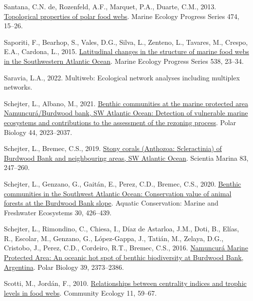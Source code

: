 \documentclass[preprint, 3p,
authoryear]{elsarticle} %
\newlength{\cslhangindent}
\newlength{\cslentryspacingunit} %
\newenvironment{CSLReferences}[2] %
 {%
  \setlength{\parindent}{0pt}
  \ifodd #1
  \let\oldpar\par
  \def\par{\hangindent=\cslhangindent\oldpar}
  \fi
  \setlength{\parskip}{#2\cslentryspacingunit}
 }%
 {}
\begin{document}
\begin{CSLReferences}{1}{0}
\leavevmode{}%
Santana, C.N. de, Rozenfeld, A.F., Marquet, P.A., Duarte, C.M., 2013.
\href{https://doi.org/10.3354/meps10073}{Topological properties of polar
food webs}. Marine Ecology Progress Series 474, 15--26.

\leavevmode{}%
Saporiti, F., Bearhop, S., Vales, D.G., Silva, L., Zenteno, L., Tavares,
M., Crespo, E.A., Cardona, L., 2015.
\href{https://doi.org/10.3354/meps11464}{Latitudinal changes in the
structure of marine food webs in the {Southwestern Atlantic Ocean}}.
Marine Ecology Progress Series 538, 23--34.

\leavevmode{}%
Saravia, L.A., 2022. Multiweb: {Ecological} network analyses including
multiplex networks.

\leavevmode{}%
Schejter, L., Albano, M., 2021.
\href{https://doi.org/10.1007/s00300-021-02936-y}{Benthic communities at
the marine protected area {Namuncurá}/{Burdwood} bank, {SW Atlantic
Ocean}: Detection of vulnerable marine ecosystems and contributions to
the assessment of the rezoning process}. Polar Biology 44, 2023--2037.

\leavevmode{}%
Schejter, L., Bremec, C.S., 2019.
\href{https://doi.org/10.3989/scimar.04863.10A}{Stony corals
({Anthozoa}: {Scleractinia}) of {Burdwood Bank} and neighbouring areas,
{SW Atlantic Ocean}}. Scientia Marina 83, 247--260.

\leavevmode{}%
Schejter, L., Genzano, G., Gaitán, E., Perez, C.D., Bremec, C.S., 2020.
\href{https://doi.org/10.1002/aqc.3265}{Benthic communities in the
{Southwest Atlantic Ocean}: {Conservation} value of animal forests at
the {Burdwood Bank} slope}. Aquatic Conservation: Marine and Freshwater
Ecosystems 30, 426--439.

\leavevmode{}%
Schejter, L., Rimondino, C., Chiesa, I., Díaz de Astarloa, J.M., Doti,
B., Elías, R., Escolar, M., Genzano, G., López-Gappa, J., Tatián, M.,
Zelaya, D.G., Cristobo, J., Perez, C.D., Cordeiro, R.T., Bremec, C.S.,
2016. \href{https://doi.org/10.1007/s00300-016-1913-2}{Namuncurá {Marine
Protected Area}: An oceanic hot spot of benthic biodiversity at
{Burdwood Bank}, {Argentina}}. Polar Biology 39, 2373--2386.

\leavevmode{}%
Scotti, M., Jordán, F., 2010.
\href{https://doi.org/10.1556/ComEc.11.2010.1.9}{Relationships between
centrality indices and trophic levels in food webs}. Community Ecology
11, 59--67.


\end{CSLReferences}
\end{document}
